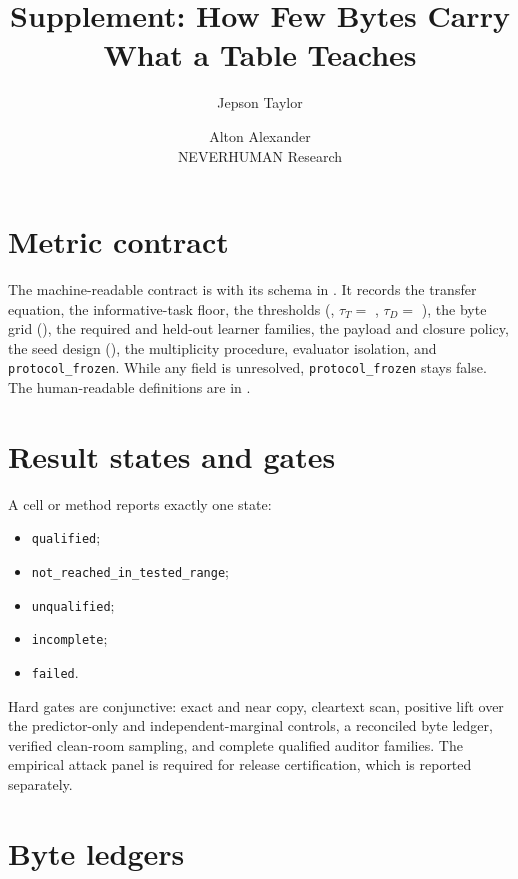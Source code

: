 \documentclass{article}
\title{Supplement: How Few Bytes Carry What a Table Teaches}
\author{Jepson Taylor \and Alton Alexander\\NEVERHUMAN Research}
\begin{document}
\maketitle
\fancyhead{}
\renewcommand{\headrulewidth}{0pt}
\appendix

\section{Metric contract}
\label{app:contract}
The machine-readable contract is  with its schema in
. It records the transfer equation, the informative-task floor, the
thresholds (\HeadlinePoint{}, $\tau_T = $ \TauT, $\tau_D = $ \TauD), the byte grid
(\ByteGrid), the required and held-out learner families, the payload and closure policy,
the seed design (\SeedDesign), the multiplicity procedure, evaluator isolation, and
\texttt{protocol\_frozen}. While any field is unresolved, \texttt{protocol\_frozen} stays
false. The human-readable definitions are in .

\section{Result states and gates}
\label{app:states}
A cell or method reports exactly one state:
\begin{itemize}
  \item \texttt{qualified};
  \item \texttt{not\_reached\_in\_tested\_range};
  \item \texttt{unqualified};
  \item \texttt{incomplete};
  \item \texttt{failed}.
\end{itemize}
Hard gates are conjunctive: exact and near copy, cleartext scan, positive
lift over the predictor-only and independent-marginal controls, a reconciled byte ledger,
verified clean-room sampling, and complete qualified auditor families. The empirical attack
panel is required for release certification, which is reported separately.

\section{Byte ledgers}
\label{app:bytes}
\end{document}
